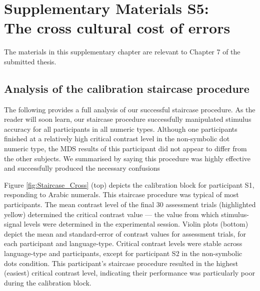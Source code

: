 \chapter{Supplementary Materials S5: \\ The cross cultural cost of errors}
\label{Appendix:E_CrossWheelTask}

\setcounter{equation}{0}
\setcounter{figure}{0}
\setcounter{table}{0}
\setcounter{section}{0}
\renewcommand\thefigure{S5\thesection.\arabic{figure}}
\renewcommand\thetable{S5\thesection.\arabic{table}}

\noindent The materials in this supplementary chapter are relevant to Chapter 7 of the submitted thesis.

\newpage

\section{Analysis of the calibration staircase procedure}
\label{Appendix:Staircase}

The following provides a full analysis of our successful staircase procedure. As the reader will soon learn, our staircase procedure successfully manipulated stimulus accuracy for all participants in all numeric types. Although one participants finished at a relatively high critical contrast level in the non-symbolic dot numeric type, the MDS results of this participant did not appear to differ from the other subjects. We summarised by saying this procedure was highly effective and successfully produced the necessary confusions

Figure \ref{fig:Staircase_Cross} (top) depicts the calibration block for participant S1, responding to Arabic numerals. This staircase procedure was typical of most participants. The mean contrast level of the final 30 assessment trials (highlighted yellow) determined the critical contrast value --- the value from which stimulus-signal levels were determined in the experimental session. Violin plots (bottom) depict the mean and standard-error of contrast values for assessment trials, for each participant and language-type. Critical contrast levels were stable across language-type and participants, except for participant S2 in the non-symbolic dots condition. This participant's staircase procedure resulted in the highest (easiest) critical contrast level, indicating their performance was particularly poor during the calibration block. 

